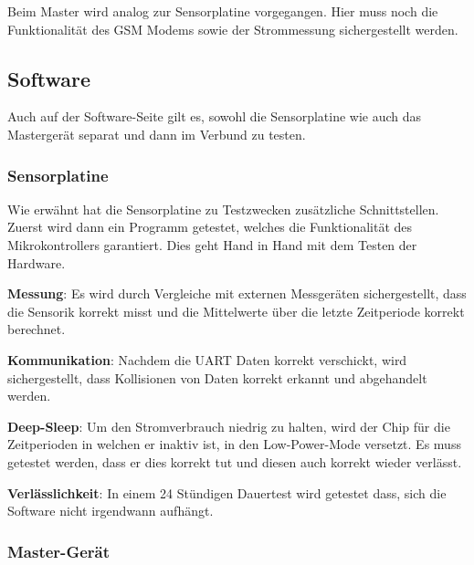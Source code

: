 Beim  Master wird  analog zur  Sensorplatine vorgegangen. Hier  muss noch  die
Funktionalit\"at des GSM Modems sowie der Strommessung sichergestellt werden.


\subsection{Software}

Auch auf  der Software-Seite gilt  es, sowohl  die Sensorplatine wie  auch das
Masterger\"at separat und dann im Verbund zu testen.



\subsubsection{Sensorplatine}

Wie   erw\"ahnt   hat   die   Sensorplatine   zu   Testzwecken   zus\"atzliche
Schnittstellen. Zuerst   wird  dann   ein  Programm   getestet,  welches   die
Funktionalit\"at des  Mikrokontrollers garantiert. Dies geht Hand  in Hand mit
dem Testen der Hardware.

\textbf{Messung}: Es   wird  durch   Vergleiche  mit   externen  Messger\"aten
sichergestellt, dass die Sensorik korrekt misst und die Mittelwerte \"uber die
letzte Zeitperiode korrekt berechnet.

\textbf{Kommunikation}: Nachdem  die  UART   Daten  korrekt  verschickt,  wird
sichergestellt,  dass Kollisionen  von Daten  korrekt erkannt  und abgehandelt
werden.

\textbf{Deep-Sleep}: Um den  Stromverbrauch niedrig  zu halten, wird  der Chip
f\"ur  die Zeitperioden  in  welchen  er inaktiv  ist,  in den  Low-Power-Mode
versetzt. Es muss  getestet werden, dass er  dies korrekt tut und  diesen auch
korrekt wieder verl\"asst.

\textbf{Verl\"asslichkeit}: In  einem 24  St\"undigen Dauertest  wird getestet
dass, sich die Software nicht irgendwann aufh\"angt.

\subsubsection{Master-Ger\"at}

